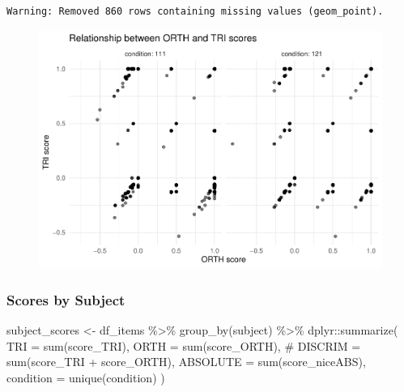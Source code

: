 \documentclass[
  letterpaper,
  DIV=11,
  numbers=noendperiod]{scrreprt}
\newenvironment{Shaded}{\begin{snugshade}}{\end{snugshade}}
\newcommand{\AttributeTok}[1]{\textcolor[rgb]{0.40,0.45,0.13}{#1}}
\newcommand{\CommentTok}[1]{\textcolor[rgb]{0.37,0.37,0.37}{#1}}
\newcommand{\FunctionTok}[1]{\textcolor[rgb]{0.28,0.35,0.67}{#1}}
\newcommand{\NormalTok}[1]{\textcolor[rgb]{0.00,0.23,0.31}{#1}}
\newcommand{\OtherTok}[1]{\textcolor[rgb]{0.00,0.23,0.31}{#1}}
\newcommand{\SpecialCharTok}[1]{\textcolor[rgb]{0.37,0.37,0.37}{#1}}
\begin{document}
\begin{verbatim}
Warning: Removed 860 rows containing missing values (geom_point).
\end{verbatim}

\begin{figure}[H]

{\centering \includegraphics{analysis/SGC3A/2_sgc3A_scoring_files/figure-pdf/unnamed-chunk-85-1.pdf}

}

\end{figure}

\hypertarget{scores-by-subject}{%
\subsubsection{Scores by Subject}\label{scores-by-subject}}

\begin{Shaded}
\begin{Highlighting}[]
\NormalTok{subject\_scores }\OtherTok{\textless{}{-}}\NormalTok{ df\_items }\SpecialCharTok{\%\textgreater{}\%} \FunctionTok{group\_by}\NormalTok{(subject) }\SpecialCharTok{\%\textgreater{}\%}\NormalTok{ dplyr}\SpecialCharTok{::}\FunctionTok{summarize}\NormalTok{(}
  \AttributeTok{TRI =} \FunctionTok{sum}\NormalTok{(score\_TRI),}
  \AttributeTok{ORTH =} \FunctionTok{sum}\NormalTok{(score\_ORTH),}
  \CommentTok{\# DISCRIM = sum(score\_TRI + score\_ORTH),}
  \AttributeTok{ABSOLUTE =} \FunctionTok{sum}\NormalTok{(score\_niceABS),}
  \AttributeTok{condition =} \FunctionTok{unique}\NormalTok{(condition)}
\NormalTok{)}
\end{Highlighting}
\end{Shaded}
\end{document}
